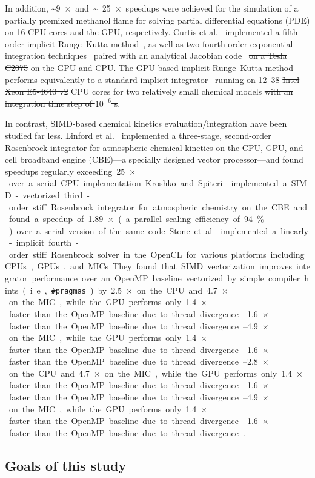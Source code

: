 \documentclass[12pt,number,sort&compress,preprint]{elsarticle}
\newcommand{\revise}[1]{{\sloppy\textcolor{RoyalPurple}{#1}}}  %
\newcommand{\revisedelete}[1]{\sloppy\textcolor{RoyalPurple}{\sout{#1}}} %
\begin{document}
\revise{In addition, \textasciitilde\SI{9}{$\times$} and \textasciitilde\SI{25}{$\times$} speedups} were achieved for the simulation of a partially premixed methanol flame for solving partial differential equations (PDE) on 16 CPU cores and the GPU, respectively.
Curtis et al.~\cite{CurtisGPU:2017} implemented a fifth-order implicit Runge--Kutta method~\cite{wanner1991solving}, as well as two fourth-order exponential integration techniques~\cite{Hochbruck:1998,Hockbruck:2009} paired with an analytical Jacobian code~\cite{Niemeyer:2016aa} \revisedelete{on a Tesla C2075} \revise{on the GPU and CPU}.
The \revise{GPU-based} implicit Runge--Kutta method performs equivalently to a standard implicit integrator~\cite{Hindmarsh:2005} running on \numrange{12}{38} \revisedelete{Intel Xeon E5-4640 v2} CPU cores for two relatively small chemical models \revisedelete{with an integration time step of $10^{-6}$ s}.

In contrast, SIMD-based chemical kinetics evaluation\slash integration have been studied far less.
Linford et al.~\cite{Linford:2011} implemented a three-stage, second-order Rosenbrock integrator for atmospheric chemical kinetics on the CPU, GPU, and cell broadband engine (CBE)---a specially designed vector processor---and found speedups regularly exceeding~\SI{25}{$\times$} over a serial CPU implementation.
Kroshko and Spiteri~\cite{kroshko2013efficient} implemented a SIMD-vectorized third-order stiff Rosenbrock integrator for atmospheric chemistry on the CBE and found a speedup of \SI{1.89}{$\times$} (a parallel scaling efficiency of \SI{94}{$\percent$}) over a serial version of the same code.
Stone et al.~\cite{stone2018} implemented a linearly-implicit fourth-order stiff Rosenbrock solver in the OpenCL for various platforms including CPUs, GPUs, and MICs.
They found that SIMD vectorization improves integrator performance over an OpenMP baseline vectorized by simple compiler hints (i.e., \texttt{\#pragmas}) by \SIrange{2.5}{2.8}{$\times$} on the CPU and \SIrange{4.7}{4.9}{$\times$} on the MIC, while the GPU performs only \SIrange{1.4}{1.6}{$\times$} faster than the OpenMP baseline due to thread divergence~\cite{stone2018}.


\subsection{Goals of this study}
\label{S:Goals}
\end{document}
